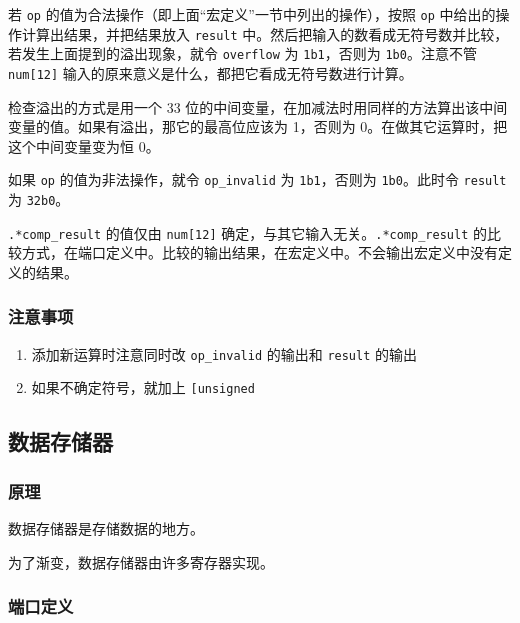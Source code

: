 若 \texttt{op} 的值为合法操作（即上面``宏定义''一节中列出的操作），按照
\texttt{op} 中给出的操作计算出结果，并把结果放入 \texttt{result}
中。然后把输入的数看成无符号数并比较，若发生上面提到的溢出现象，就令
\texttt{overflow} 为 \texttt{1\textquotesingle{}b1}，否则为
\texttt{1\textquotesingle{}b0}。注意不管 \texttt{num{[}12{]}}
输入的原来意义是什么，都把它看成无符号数进行计算。

检查溢出的方式是用一个 33
位的中间变量，在加减法时用同样的方法算出该中间变量的值。如果有溢出，那它的最高位应该为
1，否则为 0。在做其它运算时，把这个中间变量变为恒 0。

如果 \texttt{op} 的值为非法操作，就令 \texttt{op\_invalid} 为
\texttt{1\textquotesingle{}b1}，否则为
\texttt{1\textquotesingle{}b0}。此时令 \texttt{result} 为
\texttt{32\textquotesingle{}b0}。

\texttt{.*comp\_result} 的值仅由 \texttt{num{[}12{]}}
确定，与其它输入无关。\texttt{.*comp\_result}
的比较方式，在端口定义中。比较的输出结果，在宏定义中。不会输出宏定义中没有定义的结果。

\hypertarget{ux6ce8ux610fux4e8bux9879-4}{%
\subsubsection{注意事项}\label{ux6ce8ux610fux4e8bux9879-4}}

\begin{enumerate}
\def\labelenumi{\arabic{enumi}.}
\tightlist
\item
  添加新运算时注意同时改 \texttt{op\_invalid} 的输出和 \texttt{result}
  的输出
\item
  如果不确定符号，就加上 \texttt{{[}un\textbar{}{]}signed}
\end{enumerate}

\hypertarget{ux6570ux636eux5b58ux50a8ux5668}{%
\subsection{数据存储器}\label{ux6570ux636eux5b58ux50a8ux5668}}

\hypertarget{ux539fux7406-4}{%
\subsubsection{原理}\label{ux539fux7406-4}}

数据存储器是存储数据的地方。

为了渐变，数据存储器由许多寄存器实现。

\hypertarget{ux7aefux53e3ux5b9aux4e49-4}{%
\subsubsection{端口定义}\label{ux7aefux53e3ux5b9aux4e49-4}}

